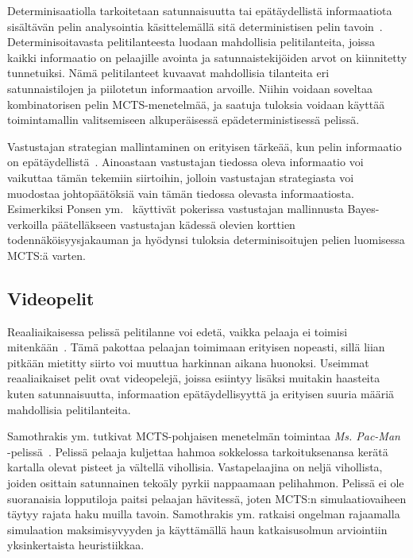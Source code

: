 \documentclass[12pt,finnish]{tktltiki2}
\theoremstyle{definition}
\theoremstyle{remark}
\begin{document}
Determinisaatiolla tarkoitetaan satunnaisuutta tai epätäydellistä informaatiota sisältävän pelin analysointia käsittelemällä sitä deterministisen pelin tavoin~\cite{browne}. Determinisoitavasta pelitilanteesta luodaan mahdollisia pelitilanteita, joissa kaikki informaatio on pelaajille avointa ja satunnaistekijöiden arvot on kiinnitetty tunnetuiksi. Nämä pelitilanteet kuvaavat mahdollisia tilanteita eri satunnaistilojen ja piilotetun informaation arvoille. Niihin voidaan soveltaa kombinatorisen pelin MCTS-menetelmää, ja saatuja tuloksia voidaan käyttää toimintamallin valitsemiseen alkuperäisessä epädeterministisessä pelissä.

Vastustajan strategian mallintaminen on erityisen tärkeää, kun pelin informaatio on epätäydellistä~\cite{browne}. Ainoastaan vastustajan tiedossa oleva informaatio voi vaikuttaa tämän tekemiin siirtoihin, jolloin vastustajan strategiasta voi muodostaa johtopäätöksiä vain tämän tiedossa olevasta informaatiosta. Esimerkiksi Ponsen ym.~\cite{ponsen} käyttivät pokerissa vastustajan mallinnusta Bayes-verkoilla päätelläkseen vastustajan kädessä olevien korttien todennäköisyysjakauman ja hyödynsi tuloksia determinisoitujen pelien luomisessa MCTS:ä varten.

\subsection{Videopelit}

Reaaliaikaisessa pelissä pelitilanne voi edetä, vaikka pelaaja ei toimisi mitenkään~\cite{browne}. Tämä pakottaa pelaajan toimimaan erityisen nopeasti, sillä liian pitkään mietitty siirto voi muuttua harkinnan aikana huonoksi. Useimmat reaaliaikaiset pelit ovat videopelejä, joissa esiintyy lisäksi muitakin haasteita kuten satunnaisuutta, informaation epätäydellisyyttä ja erityisen suuria määriä mahdollisia pelitilanteita.

Samothrakis ym. tutkivat MCTS-pohjaisen menetelmän toimintaa \textit{Ms. Pac-Man} -pelissä~\cite{samothrakis}. Pelissä pelaaja kuljettaa hahmoa sokkelossa tarkoituksenansa kerätä kartalla olevat pisteet ja vältellä vihollisia. Vastapelaajina on neljä vihollista, joiden osittain satunnainen tekoäly pyrkii nappaamaan pelihahmon. Pelissä ei ole suoranaisia lopputiloja paitsi pelaajan hävitessä, joten MCTS:n simulaatiovaiheen täytyy rajata haku muilla tavoin. Samothrakis ym. ratkaisi ongelman rajaamalla simulaation maksimisyvyyden ja käyttämällä haun katkaisusolmun arviointiin yksinkertaista heuristiikkaa.
\end{document}
